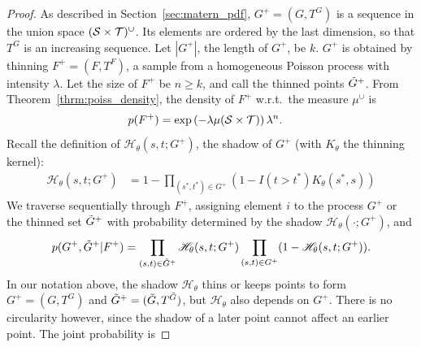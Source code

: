 \documentclass{statsoc}
\begin{document}
\begin{proof}
 As described in Section~\ref{sec:matern_pdf},  $G^+= (G, T^G)$ is a sequence in the union space $({\mathcal S}\times{\mathcal T})^{\cup}$. Its elements are ordered by the last dimension, so that $T^G$ is an
  increasing sequence. Let $|G^+|$, the length of $G^+$, be $k$. $G^+$ is obtained by thinning $F^+=(F,T^F)$, a sample from a homogeneous Poisson 
process with intensity $\lambda$.
Let the size of $F^+$ be $n \ge k$, and call the thinned points $\tilde{G}^+$. %
From Theorem~\ref{thrm:poiss_density}, the density of $F^+$ w.r.t.\ the measure ${\mu}^{\cup}$ is 
\begin{align}
 p(F^+) &= \exp\left(-\lambda \mu({\mathcal S} \times {\mathcal T})\right) \lambda^n. \label{eq:mat_prior_prob_app}
\end{align}
 Recall the definition of $\mathscr{H}_{\theta}(s,t; G^+)$, the shadow of $G^+$
(with $K_{\theta}$ the thinning kernel):
\begin{align}
  \mathscr{H}_{\theta}(s,t;G^+) &= 1 - \prod_{(s^*,t^*) \in G^+} (1 - I(t > t^*) K_{\theta}(s^*, s)) 
\end{align}
 We traverse sequentially through $F^+$, assigning element $i$ to the \matern process $G^+$ or the thinned set $\tilde{G}^+$ with probability determined
 by the shadow $\mathscr{H}_{\theta}(\cdot;G^+)$, and %
\begin{align}
  p(G^+, \tilde{G}^+ | F^+) = \prod_{(s,t) \in \tilde{G}^+} \mathscr{H}_{\theta}(s,t;G^+)  \prod_{(s,t) \in G^+} (1- \mathscr{H}_{\theta}(s,t;G^+)).   \label{eq:mat_marg_app}
\end{align}
In our notation above, the shadow $\mathscr{H}_{\theta}$ thins or keeps points to form $G^+=(G,T^G)$ and $\tilde{G}^+=(\tilde{G}, T^{\tilde{G}})$, but $\mathscr{H}_{\theta}$ also depends on 
$G^+$. There is no circularity however, since the shadow of a later point cannot affect an earlier point. The joint probability is 

\end{proof}
\end{document}
